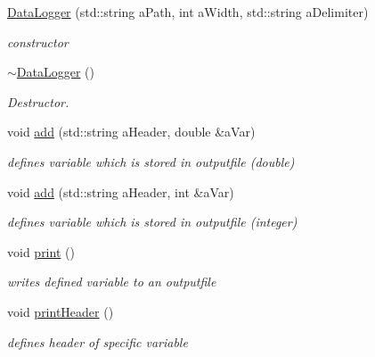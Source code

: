 \begin{DoxyCompactItemize}
\item 
\mbox{\label{group___tools_aa95dc52c00e81fcb074ef4224d305238}} 
\hyperlink{group___tools_aa95dc52c00e81fcb074ef4224d305238}{Data\+Logger} (std\+::string a\+Path, int a\+Width, std\+::string a\+Delimiter)
\begin{DoxyCompactList}\small\item\em constructor \end{DoxyCompactList}\item 
\mbox{\label{group___tools_a9aaff109f3e7749a0a0a0313655da50a}} 
\hyperlink{group___tools_a9aaff109f3e7749a0a0a0313655da50a}{$\sim$\+Data\+Logger} ()
\begin{DoxyCompactList}\small\item\em Destructor. \end{DoxyCompactList}\item 
\mbox{\label{group___tools_a31d8ed8cfdda531f19236e214d5d931f}} 
void \hyperlink{group___tools_a31d8ed8cfdda531f19236e214d5d931f}{add} (std\+::string a\+Header, double \&a\+Var)
\begin{DoxyCompactList}\small\item\em defines variable which is stored in outputfile (double) \end{DoxyCompactList}\item 
\mbox{\label{group___tools_a9af9879fe968dee468b3e479cadf073a}} 
void \hyperlink{group___tools_a9af9879fe968dee468b3e479cadf073a}{add} (std\+::string a\+Header, int \&a\+Var)
\begin{DoxyCompactList}\small\item\em defines variable which is stored in outputfile (integer) \end{DoxyCompactList}\item 
\mbox{\label{group___tools_aa1bd66fc07169787398f386d9276708b}} 
void \hyperlink{group___tools_aa1bd66fc07169787398f386d9276708b}{print} ()
\begin{DoxyCompactList}\small\item\em writes defined variable to an outputfile \end{DoxyCompactList}\item 
\mbox{\label{group___tools_ad7247b2350411b48f323de6c91e8479c}} 
void \hyperlink{group___tools_ad7247b2350411b48f323de6c91e8479c}{print\+Header} ()
\begin{DoxyCompactList}\small\item\em defines header of specific variable \end{DoxyCompactList}\end{DoxyCompactItemize}


